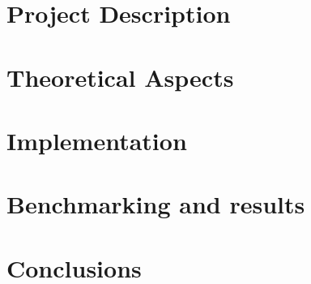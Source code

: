 \documentclass[10pt, a4paper]{report}
\begin{document}
\chapter{Project Description}

\chapter{Theoretical Aspects}

\chapter{Implementation}

\chapter{Benchmarking and results}

\chapter{Conclusions}

\begin{printbibliography}
    \thispagestyle{fancy}
\end{printbibliography}

\begin{printnoidxglossaries}
    \thispagestyle{fancy}
\end{printnoidxglossaries}
\end{document}
